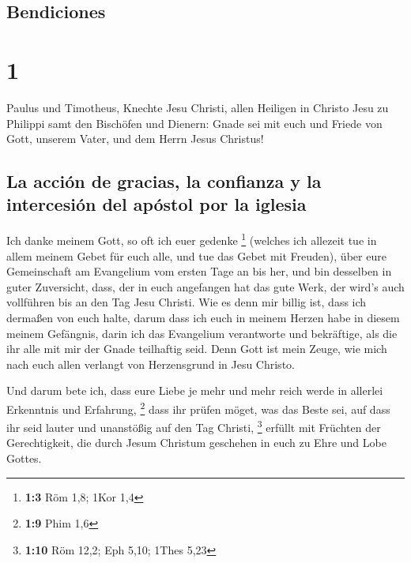\hypertarget{bendiciones}{%
\subsection{Bendiciones}\label{bendiciones}}

\hypertarget{section}{%
\section{1}\label{section}}

 Paulus und Timotheus, Knechte Jesu Christi, allen
Heiligen in Christo Jesu zu Philippi samt den Bischöfen und Dienern:
 Gnade sei mit euch und Friede von Gott, unserem Vater,
und dem Herrn Jesus Christus!

\hypertarget{la-acciuxf3n-de-gracias-la-confianza-y-la-intercesiuxf3n-del-apuxf3stol-por-la-iglesia}{%
\subsection{La acción de gracias, la confianza y la intercesión del
apóstol por la
iglesia}\label{la-acciuxf3n-de-gracias-la-confianza-y-la-intercesiuxf3n-del-apuxf3stol-por-la-iglesia}}

 Ich danke meinem Gott, so oft ich euer gedenke
\footnote{\textbf{1:3} Röm 1,8; 1Kor 1,4}  (welches ich
allezeit tue in allem meinem Gebet für euch alle, und tue das Gebet mit
Freuden),  über eure Gemeinschaft am Evangelium vom ersten
Tage an bis her,  und bin desselben in guter Zuversicht,
dass, der in euch angefangen hat das gute Werk, der wird's auch
vollführen bis an den Tag Jesu Christi.  Wie es denn mir
billig ist, dass ich dermaßen von euch halte, darum dass ich euch in
meinem Herzen habe in diesem meinem Gefängnis, darin ich das Evangelium
verantworte und bekräftige, als die ihr alle mit mir der Gnade
teilhaftig seid.  Denn Gott ist mein Zeuge, wie mich nach
euch allen verlangt von Herzensgrund in Jesu Christo.

 Und darum bete ich, dass eure Liebe je mehr und mehr
reich werde in allerlei Erkenntnis und Erfahrung, \footnote{\textbf{1:9}
  Phim 1,6}  dass ihr prüfen möget, was das Beste sei,
auf dass ihr seid lauter und unanstößig auf den Tag Christi, \footnote{\textbf{1:10}
  Röm 12,2; Eph 5,10; 1Thes 5,23}  erfüllt mit Früchten
der Gerechtigkeit, die durch Jesum Christum geschehen in euch zu Ehre
und Lobe Gottes.

